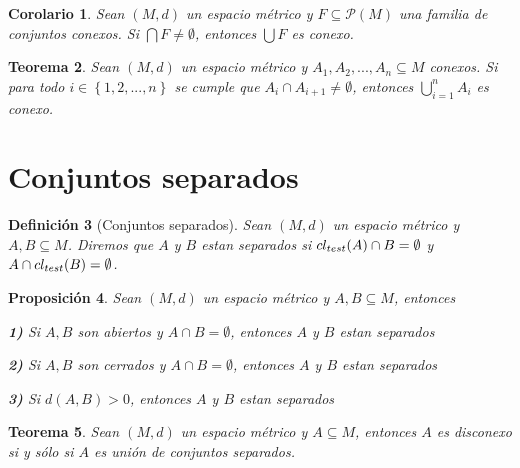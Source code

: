 \documentclass[oneside]{book} %
\theoremstyle{Teorema}
\newtheorem{Definicion}{Definición}[chapter]
\newtheorem{Teorema}[Definicion]{Teorema}
\newtheorem{Corolario}[Definicion]{Corolario}
\newtheorem{Proposicion}[Definicion]{Proposición}
\theoremstyle{Ejemplos}
\theoremstyle{[Obs]}
\def \test {test}
\newcommand{\cerradura}[2][\test]{\ifx \test #1 {\overline{#2}} \else {cl_{#1}(#2)} \fi} %
\renewcommand{\{}{\left\lbrace} %
\renewcommand{\}}{\right\rbrace} %
\newcommand{\n}{\cap} %
\newcommand{\U}{\bigcup} %
\newcommand{\N}{\bigcap} %
\renewcommand{\sc}{\subseteq} %
\renewcommand{\P}{\mathcal{P}} %
\begin{document}
			\begin{Corolario}\setlength{\parindent}{0em}
			
				Sean $(M, d)$ un espacio métrico y $F \sc \P(M)$ una familia de conjuntos conexos. Si $\N F \neq \emptyset$, entonces $\U F$ es conexo.
			
			\end{Corolario}

			\begin{Teorema}\setlength{\parindent}{0em}
			
				Sean $(M, d)$ un espacio métrico y $A_1, A_2, ..., A_n \sc M$ conexos. Si para todo $i \in \{ 1, 2, ..., n \}$ se cumple que $A_{i} \n A_{i + 1} \neq \emptyset$, entonces $\U_{i = 1}^{n} A_i$ es conexo.
			
			\end{Teorema}

		\section{Conjuntos separados}

			\begin{Definicion}[Conjuntos separados]\setlength{\parindent}{0em}
			
				Sean $(M, d)$ un espacio métrico y $A, B \sc M$. Diremos que $A$ y $B$ estan separados si $\cerradura{A} \n B = \emptyset$ y $A \n \cerradura{B} = \emptyset$.
			
			\end{Definicion}

			\begin{Proposicion}\setlength{\parindent}{0em}
			
				Sean $(M, d)$ un espacio métrico y $A, B \sc M$, entonces 
				
				\textbf{1)} Si $A, B$ son abiertos y $A \n B = \emptyset$, entonces $A$ y $B$ estan separados

				\textbf{2)} Si $A, B$ son cerrados y $A \n B = \emptyset$, entonces $A$ y $B$ estan separados

				\textbf{3)} Si $d(A, B) > 0$, entonces $A$ y $B$ estan separados
			
			\end{Proposicion}

			\begin{Teorema}\setlength{\parindent}{0em}
			
				Sean $(M, d)$ un espacio métrico y $A \sc M$, entonces $A$ es disconexo si y sólo si $A$ es unión de conjuntos separados.
			
			\end{Teorema}
\end{document}
